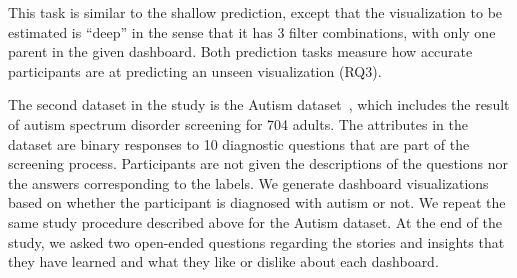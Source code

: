  This task is similar to the shallow prediction, except that the visualization to be estimated is ``deep'' in the sense that it has 3 filter combinations, with only one parent in the given dashboard. Both prediction tasks measure how accurate participants are at predicting an unseen visualization (RQ3).

\par The second dataset in the study is the Autism dataset~\cite{autism}, which includes the result of autism spectrum disorder screening for 704 adults. The attributes in the dataset are  binary responses to 10 diagnostic questions that are part of the screening process. Participants are not given the descriptions of the questions nor the answers corresponding to the labels. We generate dashboard visualizations based on whether the participant is diagnosed with autism or not. We repeat the same study procedure described above for the Autism dataset. At the end of the study, we asked two open-ended questions regarding the stories and insights that they have learned and what they like or dislike about each dashboard.
